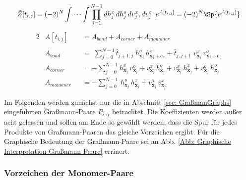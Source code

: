 \begin{grayframe}[frametitle = {Ausdruck für Pseudo-Zustandssumme mit Graßmann Variablen}]

\begin{equation}
    \begin{aligned}
        \hat{Z}[t_{i,j}]  & = (-2)^N \int \cdots \int\prod_{j=1}^{N-1} dh_{j}^x\,dh_{j}^o\,dv_{j}^x,dv_{j}^o \;\;e^{A[t_{i,j}] } = (-2)^N \Sp{e^{A[t_{i,j}] }} \nonumber\\
    \end{aligned}
\end{equation}
\begin{alignat}{2}
        & A[t_{i,j}]   &&= A_{bond} + A_{corner} + A_{monomer} \nonumber \\
        \label{eq: ZustandsBerezinIntegral} \\
        &A_{bond} &&= \; \sum_{j = 0}^{N-1} \hat{t}_{j+1, j} \; h_{\bm{x}_j}^o \,h_{\bm{x}_j+\bm{e}_x}^x
                                            + \hat{t}_{j, j+1} \; v_{\bm{x}_j}^x \,v_{\bm{x}_j+\bm{e}_y}^o \nonumber\\
       & A_{corner} &&= -\sum_{j = 0}^{N-1} h_{\bm{x}_j}^x \,v_{\bm{x}_j}^o 
                                            + v_{\bm{x}_j}^x\, h_{\bm{x}_j}^o
                                            + v_{\bm{x}_j}^x \,h_{\bm{x}_j}^x 
                                            + v_{\bm{x}_j}^o \,h_{\bm{x}_j}^o \nonumber\\
       &    A_{monomer}&&= -\sum_{j = 0}^{N-1} \, h_{\bm{x}_j}^o \,h_{\bm{x}_j}^x
                                            +  v_{\bm{x}_j}^o \,v_{\bm{x}_j}^x \nonumber
\end{alignat}
\end{grayframe}


Im Folgenden werden zunächst nur die in Abschnitt \ref{sec: GraßmanGraphs} eingeführten Graßmann-Paare $P_{i,\alpha}$ betrachtet. Die Koeffizienten werden außer acht gelassen und sollen am Ende so gewählt werden, dass die Spur für jedes Produkte von Graßmann-Paaren das gleiche Vorzeichen ergibt. Für die Graphische Bedeutung der Graßmann-Paare sei an Abb. \ref{Abb: Graphische Interpretation Graßmann Paare} errinert. 
 
\subsubsection{Vorzeichen der Monomer-Paare} \label{sec: vorzeicehnMonomer}

